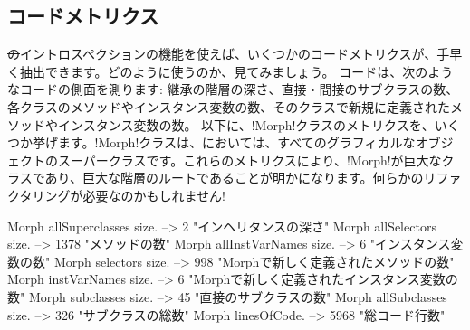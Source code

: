 \documentclass[a4paper,10pt,twoside]{book}
\begin{document}


\subsection{コードメトリクス}

\st のイントロスペクションの機能を使えば、いくつかのコードメトリクスが、手早く抽出できます。どのように使うのか、見てみましょう。
コードは、次のようなコードの側面を測ります: 継承の階層の深さ、直接・間接のサブクラスの数、各クラスのメソッドやインスタンス変数の数、そのクラスで新規に定義されたメソッドやインスタンス変数の数。
以下に、\ct!Morph!クラスのメトリクスを、いくつか挙げます。\ct!Morph!クラスは、\pharo においては、すべてのグラフィカルなオブジェクトのスーパークラスです。これらのメトリクスにより、\ct!Morph!が巨大なクラスであり、巨大な階層のルートであることが明かになります。何らかのリファクタリングが必要なのかもしれません!

\begin{code}{}
Morph allSuperclasses size.  -->       2 "インヘリタンスの深さ"
Morph allSelectors size.        --> 1378 "メソッドの数"
Morph allInstVarNames size. -->      6 "インスタンス変数の数"
Morph selectors size.             -->  998 "Morphで新しく定義されたメソッドの数"
Morph instVarNames size.     -->      6 "Morphで新しく定義されたインスタンス変数の数"
Morph subclasses size.          -->    45 "直接のサブクラスの数"
Morph allSubclasses size.      -->  326 "サブクラスの総数"
Morph linesOfCode.               --> 5968 "総コード行数"
\end{code}
\end{document}
